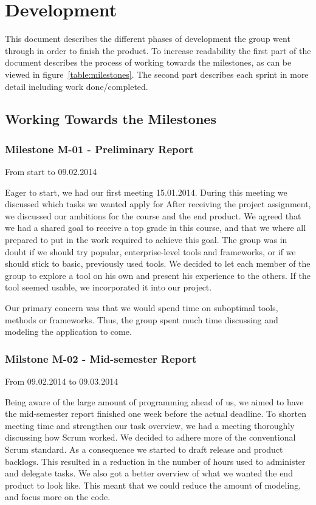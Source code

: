 \chapter{Development}

This document describes the different phases of development the group
went through in order to finish the product. To increase readability
the first part of the document describes the process of working towards the
milestones, as can be viewed in figure~\ref{table:milestones}. The second part
describes each sprint in more detail including work done/completed. 

\section{Working Towards the Milestones}
\subsection{Milestone M-01 - Preliminary Report}
\label{sec:M01}

From start to 09.02.2014

Eager to start, we had our first meeting 15.01.2014. During this meeting we
discussed which tasks we wanted apply for After receiving the project
assignment, we discussed our ambitions for the course and the end product. We
agreed that we had a shared goal to receive a top grade in this course, and
that we where all prepared to put in the work required to achieve this goal.
The group was in doubt if we should try popular, enterprise-level tools and
frameworks, or if we should stick to basic, previously used tools. We decided
to let each member of the group to explore a tool on his own and present his
experience to the others. If the tool seemed usable, we incorporated it into
our project.

Our primary concern was that we would spend time on suboptimal tools, methods
or frameworks. Thus, the group spent much time discussing and modeling the
application to come. 

\pagebreak
\subsection{Milstone M-02 - Mid-semester Report}
\label{sec:M02}
From 09.02.2014 to 09.03.2014

Being aware of the large amount of programming ahead of us, we aimed to have
the mid-semester report finished one week before the actual deadline. To
shorten meeting time and strengthen our task overview, we had a meeting
thoroughly discussing how Scrum worked. We decided to adhere more of the
conventional Scrum standard. As a consequence we started to draft release and
product backlogs. This resulted in a reduction in the number of hours used to
administer and delegate tasks. We also got a better overview of what we wanted
the end product to look like. This meant that we could reduce the amount of
modeling, and focus more on the code. 

